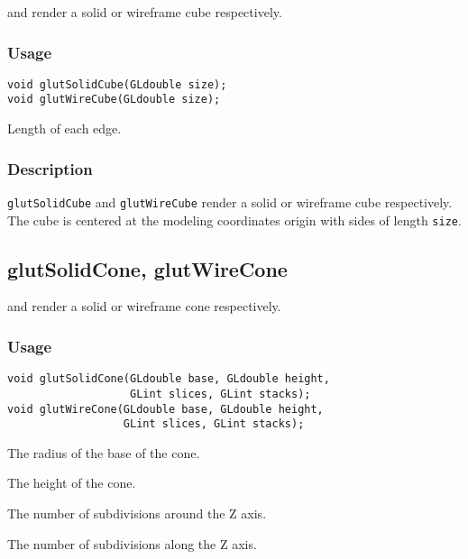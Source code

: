  and  render a solid or wireframe
cube respectively.

\subsubsection*{Usage}
\begin{verbatim}
void glutSolidCube(GLdouble size);
void glutWireCube(GLdouble size);
\end{verbatim}
\begin{description}
\itemsep 0in
\item[{\tt size}]
Length of each edge.
\end{description}

\subsubsection*{Description}

{\tt glutSolidCube} and {\tt glutWireCube} render a solid or wireframe
cube respectively.
The cube is centered at the modeling coordinates origin with sides of length {\tt size}.

\subsection{glutSolidCone, glutWireCone}

 and  render a solid or wireframe
cone respectively.

\subsubsection*{Usage}
\begin{verbatim}
void glutSolidCone(GLdouble base, GLdouble height,
                   GLint slices, GLint stacks);
void glutWireCone(GLdouble base, GLdouble height,
                  GLint slices, GLint stacks);
\end{verbatim}
\begin{description}
\itemsep 0in
\item[\tt base]
The radius of the base of the cone.
\item[\tt height]
The height of the cone.
\item[\tt slices]
The number of subdivisions around the Z axis.
\item[\tt stacks]
The number of subdivisions along the Z axis.
\end{description}

